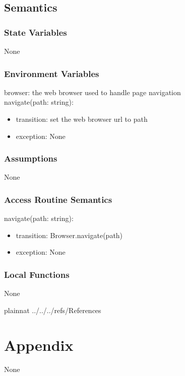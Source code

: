 \documentclass[12pt, titlepage]{article}
\begin{document}
\subsection{Semantics}

\subsubsection{State Variables}

None

\subsubsection{Environment Variables}

browser: the web browser used to handle page navigation\\
navigate(path: string):
\begin{itemize}
    \item transition: set the web browser url to path
    \item exception:    None
\end{itemize}

\subsubsection{Assumptions}

None

\subsubsection{Access Routine Semantics}

\noindent navigate(path: string):
\begin{itemize}
    \item transition: Browser.navigate(path)
    \item exception: None
\end{itemize}


\subsubsection{Local Functions}

None

\newpage

 {plainnat}
 {../../../refs/References}

\newpage

\section{Appendix} \label{Appendix}

None
\end{document}
